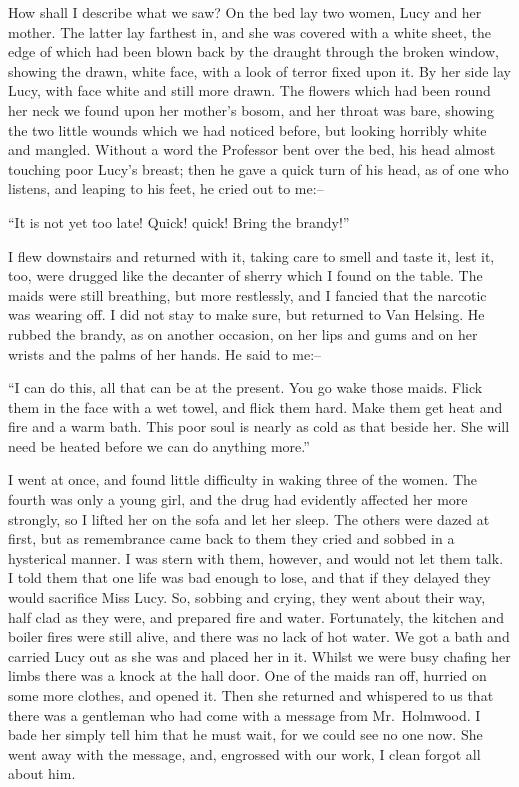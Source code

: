 \documentclass[12pt,openright]{book}
\begin{document}
How shall I describe what we saw? On the bed lay two women, Lucy and her mother. The latter lay farthest in, and she was covered with a white sheet, the edge of which had been blown back by the draught through the broken window, showing the drawn, white face, with a look of terror fixed upon it. By her side lay Lucy, with face white and still more drawn. The flowers which had been round her neck we found upon her mother’s bosom, and her throat was bare, showing the two little wounds which we had noticed before, but looking horribly white and mangled. Without a word the Professor bent over the bed, his head almost touching poor Lucy’s breast; then he gave a quick turn of his head, as of one who listens, and leaping to his feet, he cried out to me:–

“It is not yet too late! Quick! quick! Bring the brandy!”

I flew downstairs and returned with it, taking care to smell and taste it, lest it, too, were drugged like the decanter of sherry which I found on the table. The maids were still breathing, but more restlessly, and I fancied that the narcotic was wearing off. I did not stay to make sure, but returned to Van Helsing. He rubbed the brandy, as on another occasion, on her lips and gums and on her wrists and the palms of her hands. He said to me:–

“I can do this, all that can be at the present. You go wake those maids. Flick them in the face with a wet towel, and flick them hard. Make them get heat and fire and a warm bath. This poor soul is nearly as cold as that beside her. She will need be heated before we can do anything more.”

I went at once, and found little difficulty in waking three of the women. The fourth was only a young girl, and the drug had evidently affected her more strongly, so I lifted her on the sofa and let her sleep. The others were dazed at first, but as remembrance came back to them they cried and sobbed in a hysterical manner. I was stern with them, however, and would not let them talk. I told them that one life was bad enough to lose, and that if they delayed they would sacrifice Miss Lucy. So, sobbing and crying, they went about their way, half clad as they were, and prepared fire and water. Fortunately, the kitchen and boiler fires were still alive, and there was no lack of hot water. We got a bath and carried Lucy out as she was and placed her in it. Whilst we were busy chafing her limbs there was a knock at the hall door. One of the maids ran off, hurried on some more clothes, and opened it. Then she returned and whispered to us that there was a gentleman who had come with a message from Mr. Holmwood. I bade her simply tell him that he must wait, for we could see no one now. She went away with the message, and, engrossed with our work, I clean forgot all about him.
\end{document}
